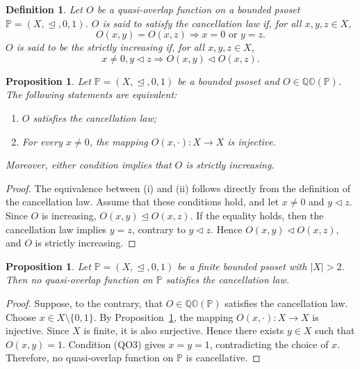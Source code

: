 \documentclass[preprint,12pt]{elsarticle}
\newtheorem{proposition}[theorem]{Proposition}
\newtheorem{definition}[theorem]{Definition}
\begin{document}
\begin{definition}
\emph{Let $O$ be a quasi-overlap function on a bounded psoset $\mathbb{P}=(X,\trianglelefteq,0,1)$. $O$ is said to satisfy the \emph{cancellation law} if, for all $x,y,z\in X$,
$$
 O(x,y)=O(x,z)\Longrightarrow x=0\mbox{ or }y=z.
$$
 $O$ is said to be the \emph{strictly increasing} if, for all $x,y,z\in X$,
$$
 x\neq0, y\triangleleft z\Longrightarrow O(x,y)\triangleleft O(x,z).
$$}
\end{definition}

\begin{proposition}\label{prop:cancellation-injective}
Let $\mathbb{P}=(X,\trianglelefteq,0,1)$ be a bounded psoset and $O\in\mathbb{QO}(\mathbb{P})$. The following statements are equivalent:
\begin{enumerate}[label=(\roman*)]
\item $O$ satisfies the cancellation law;
\item For every $x\neq0$, the mapping $O(x,\cdot):X\to X$ is injective.
\end{enumerate}
Moreover, either condition implies that $O$ is strictly increasing.
\end{proposition}

\begin{proof}
The equivalence between (i) and (ii) follows directly from the definition of the cancellation law. Assume that these conditions hold, and let $x\neq0$ and $y\triangleleft z$. Since $O$ is increasing,
$
 O(x,y)\trianglelefteq O(x,z).
$
If the equality holds, then the cancellation law implies $y=z$, contrary to $y\triangleleft z$. Hence
$
 O(x,y)\triangleleft O(x,z),
$
and $O$ is strictly increasing.
\end{proof}

\begin{proposition}\label{prop:finite-no-cancellation}
Let $\mathbb{P}=(X,\trianglelefteq,0,1)$ be a finite bounded psoset with $|X|>2$. Then no quasi-overlap function on $\mathbb{P}$ satisfies the cancellation law.
\end{proposition}

\begin{proof}
Suppose, to the contrary, that $O\in\mathbb{QO}(\mathbb{P})$ satisfies the cancellation law. Choose $x\in X\setminus\{0,1\}$. By Proposition~\ref{prop:cancellation-injective}, the mapping
$
 O(x,\cdot):X\to X
$
is injective. Since $X$ is finite, it is also surjective. Hence there exists $y\in X$ such that $O(x,y)=1.$ Condition (QO3) gives $x=y=1$, contradicting the choice of $x$. Therefore, no quasi-overlap function on $\mathbb{P}$ is cancellative.
\end{proof}
\end{document}
